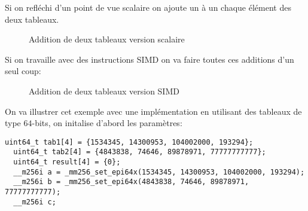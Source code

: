 \documentclass[12pt]{article}
\begin{document}
\vspace{1cm}

Si on refléchi d'un point de vue scalaire on ajoute un à un chaque élément des deux tableaux.
\vspace{1cm}
\begin{figure}[h!]
    \centering
{}
    \caption{Addition de deux tableaux version scalaire}
    \label{fig:scalar addition}
\end{figure}
\vspace{1cm}
\newline
Si on travaille avec des instructions SIMD on va faire toutes ces additions d'un seul coup:
\vspace{1cm}

\begin{figure}[h!]
    \centering
{}
    \caption{Addition de deux tableaux version SIMD}
    \label{fig:SIMD addition}
\end{figure}





\vspace{1cm}
On va illustrer cet exemple avec une implémentation en utilisant des tableaux de type $64$-bits, on initalise d'abord les paramètres:
\medskip
\begin{lstlisting}[style = Cstyle]
  uint64_t tab1[4] = {1534345, 14300953, 104002000, 193294};
  uint64_t tab2[4] = {4843838, 74646, 89878971, 77777777777};
  uint64_t result[4] = {0};
  __m256i a = _mm256_set_epi64x(1534345, 14300953, 104002000, 193294);
  __m256i b = _mm256_set_epi64x(4843838, 74646, 89878971, 77777777777);
  __m256i c;
\end{lstlisting}
\vspace{1cm}
\end{document}
